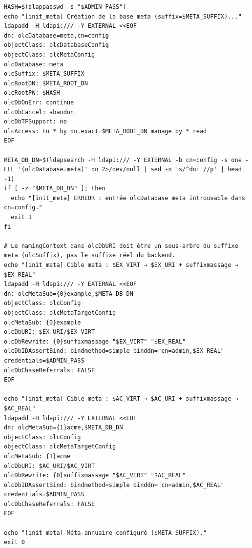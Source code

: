 {\begin{verbatim}
HASH=$(slappasswd -s "$ADMIN_PASS")
echo "[init_meta] Création de la base meta (suffix=$META_SUFFIX)..."
ldapadd -H ldapi:/// -Y EXTERNAL <<EOF
dn: olcDatabase=meta,cn=config
objectClass: olcDatabaseConfig
objectClass: olcMetaConfig
olcDatabase: meta
olcSuffix: $META_SUFFIX
olcRootDN: $META_ROOT_DN
olcRootPW: $HASH
olcDbOnErr: continue
olcDbCancel: abandon
olcDbTFSupport: no
olcAccess: to * by dn.exact=$META_ROOT_DN manage by * read
EOF

META_DB_DN=$(ldapsearch -H ldapi:/// -Y EXTERNAL -b cn=config -s one -LLL '(olcDatabase=meta)' dn 2>/dev/null | sed -n 's/^dn: //p' | head -1)
if [ -z "$META_DB_DN" ]; then
  echo "[init_meta] ERREUR : entrée olcDatabase meta introuvable dans cn=config."
  exit 1
fi

# Le namingContext dans olcDbURI doit être un sous-arbre du suffixe meta (olcSuffix), pas le suffixe réel du backend.
echo "[init_meta] Cible meta : $EX_VIRT → $EX_URI + suffixmassage → $EX_REAL"
ldapadd -H ldapi:/// -Y EXTERNAL <<EOF
dn: olcMetaSub={0}example,$META_DB_DN
objectClass: olcConfig
objectClass: olcMetaTargetConfig
olcMetaSub: {0}example
olcDbURI: $EX_URI/$EX_VIRT
olcDbRewrite: {0}suffixmassage "$EX_VIRT" "$EX_REAL"
olcDbIDAssertBind: bindmethod=simple binddn="cn=admin,$EX_REAL" credentials=$ADMIN_PASS
olcDbChaseReferrals: FALSE
EOF

echo "[init_meta] Cible meta : $AC_VIRT → $AC_URI + suffixmassage → $AC_REAL"
ldapadd -H ldapi:/// -Y EXTERNAL <<EOF
dn: olcMetaSub={1}acme,$META_DB_DN
objectClass: olcConfig
objectClass: olcMetaTargetConfig
olcMetaSub: {1}acme
olcDbURI: $AC_URI/$AC_VIRT
olcDbRewrite: {0}suffixmassage "$AC_VIRT" "$AC_REAL"
olcDbIDAssertBind: bindmethod=simple binddn="cn=admin,$AC_REAL" credentials=$ADMIN_PASS
olcDbChaseReferrals: FALSE
EOF

echo "[init_meta] Méta-annuaire configuré ($META_SUFFIX)."
exit 0
\end{verbatim}
}

